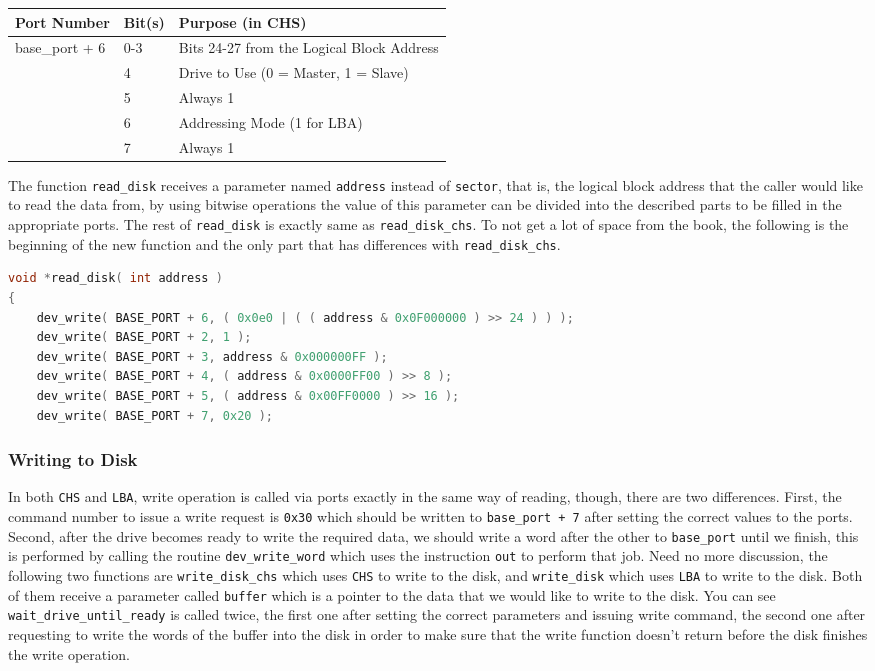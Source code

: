 \begin{longtable}[]{@{}lll@{}}
\toprule
Port Number & Bit(s) & Purpose (in CHS)\tabularnewline
\midrule
\endhead
base\_port + 6 & 0-3 & Bits 24-27 from the Logical Block
Address\tabularnewline
& 4 & Drive to Use (0 = Master, 1 = Slave)\tabularnewline
& 5 & Always 1\tabularnewline
& 6 & Addressing Mode (1 for LBA)\tabularnewline
& 7 & Always 1\tabularnewline
\bottomrule
\end{longtable}

The function \lstinline!read_disk! receives a parameter named
\lstinline!address! instead of \lstinline!sector!, that is, the logical
block address that the caller would like to read the data from, by using
bitwise operations the value of this parameter can be divided into the
described parts to be filled in the appropriate ports. The rest of
\lstinline!read_disk! is exactly same as \lstinline!read_disk_chs!. To
not get a lot of space from the book, the following is the beginning of
the new function and the only part that has differences with
\lstinline!read_disk_chs!.

\begin{lstlisting}[language=C]
void *read_disk( int address )
{
    dev_write( BASE_PORT + 6, ( 0x0e0 | ( ( address & 0x0F000000 ) >> 24 ) ) );
    dev_write( BASE_PORT + 2, 1 );
    dev_write( BASE_PORT + 3, address & 0x000000FF );
    dev_write( BASE_PORT + 4, ( address & 0x0000FF00 ) >> 8 );
    dev_write( BASE_PORT + 5, ( address & 0x00FF0000 ) >> 16 );
    dev_write( BASE_PORT + 7, 0x20 ); 
\end{lstlisting}

\subsubsection{Writing to Disk}\label{writing-to-disk}

In both \lstinline!CHS! and \lstinline!LBA!, write operation is called
via ports exactly in the same way of reading, though, there are two
differences. First, the command number to issue a write request is
\lstinline!0x30! which should be written to \lstinline!base_port + 7!
after setting the correct values to the ports. Second, after the drive
becomes ready to write the required data, we should write a word after
the other to \lstinline!base_port! until we finish, this is performed by
calling the routine \lstinline!dev_write_word! which uses the
instruction \lstinline!out! to perform that job. Need no more
discussion, the following two functions are \lstinline!write_disk_chs!
which uses \lstinline!CHS! to write to the disk, and
\lstinline!write_disk! which uses \lstinline!LBA! to write to the disk.
Both of them receive a parameter called \lstinline!buffer! which is a
pointer to the data that we would like to write to the disk. You can see
\texttt{wait\_drive\_until\_ready} is called twice, the first one after
setting the correct parameters and issuing write command, the second one
after requesting to write the words of the buffer into the disk in order
to make sure that the write function doesn't return before the disk
finishes the write operation.

